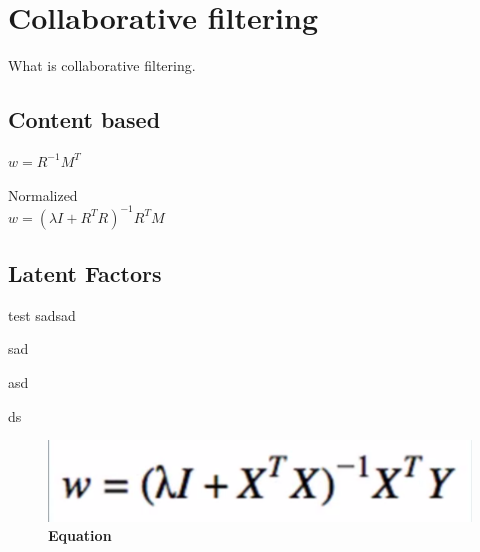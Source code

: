 \section{Collaborative filtering}
What is collaborative filtering.
\cite{RecommenderSystems:2}
\subsection{Content based}

$ w=R^{-1}M^{T} $

Normalized \\
$ w=(\lambda I + R^{T}R)^{-1} R^{T}M $

\subsection{Latent Factors}
test
sadsad

sad

asd

ds
\begin{figure}[ht]
\centering
\includegraphics[width=0.7\linewidth]{images/equation01}
\caption{\bfseries Equation}
\label{fig:equation02}
\end{figure}